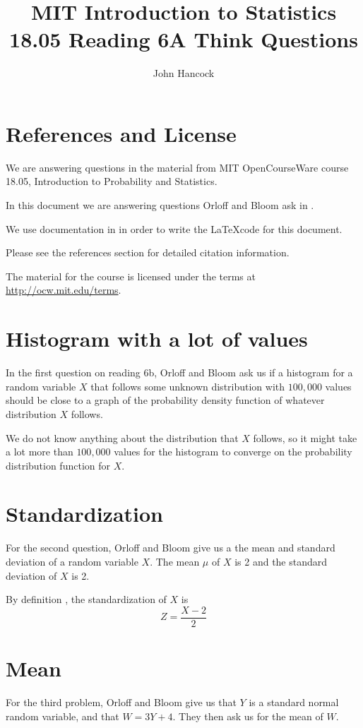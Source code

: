 \documentclass[a4paper,11pt]{article}
\author{John Hancock}
\title{MIT Introduction to Statistics 18.05 Reading 6A Think Questions }
\begin{document}
\maketitle
\tableofcontents
\section{References and License}
We are answering questions in the material from MIT OpenCourseWare
course 18.05, Introduction to Probability and Statistics.

In this document we are answering questions Orloff and Bloom ask in
\cite{reading6bQu}.

We use documentation in  in order to write the \LaTeX code
for this document.

Please see the references section for detailed citation information.

The material for the course is licensed under the terms at
\url{http://ocw.mit.edu/terms}.

\section{Histogram with a lot of values}
In the first question on reading 6b, Orloff and Bloom ask us if a histogram
for a random variable $X$ that follows some unknown distribution with $100,000$
values should be close to a graph of the probability density function of
whatever distribution $X$ follows.

We do not know anything about the distribution that $X$ follows, so it might
take a lot more than $100,000$ values for the histogram to converge on the
probability distribution function for $X$.

\section{Standardization}

For the second question, Orloff and Bloom give us a the mean and standard
deviation of a random variable $X$.  The mean $\mu$ of $X$ is 2 and the
standard deviation of $X$ is 2.

By definition \cite{reading6b}, the standardization of $X$ is
\begin{equation}
  Z = \frac{X-2}{2}
\end{equation}

\section{Mean}
For the third problem, Orloff and Bloom give us that $Y$ is a standard normal
random variable, and that $W=3Y+4$.  They then ask us for the mean of $W$.
\end{document}
